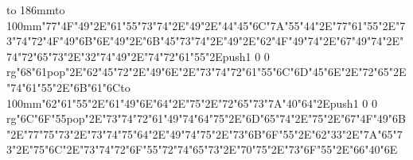 \hbox to 186mm{\hsize=81mm\vbox to 100mm{\vfill\ipa\char"77\ipa\char"4F\ipa\char"49\ipa\char"2E\ipa\char"61\ipa\char"55\ipa\char"73\ipa\char"74\ipa\char"2E\ipa\char"49\ipa\char"2E\ipa\char"44\ipa\char"45\ipa\char"6C\medskip\ipa\char"7A\ipa\char"55\ipa\char"44\ipa\char"2E\ipa\char"77\ipa\char"61\ipa\char"55\ipa\char"2E\ipa\char"73\ipa\char"74\ipa\char"72\ipa\char"4F\ipa\char"49\ipa\char"6B\medskip\ipa\char"6E\ipa\char"49\ipa\char"2E\ipa\char"6B\ipa\char"45\ipa\char"73\ipa\char"74\ipa\char"2E\ipa\char"49\ipa\char"2E\ipa\char"62\ipa\char"4F\ipa\char"49\ipa\char"74\ipa\char"2E\ipa\char"67\ipa\char"49\ipa\char"74\ipa\char"2E\ipa\char"74\ipa\char"72\ipa\char"65\ipa\char"73\ipa\char"2E\ipa\char"32\ipa\char"74\medskip\ipa\char"49\ipa\char"2E\ipa\char"74\ipa\char"72\ipa\char"61\ipa\char"55\ipa\char"2E\pdfcolorstack\match push{1 0 0 rg}\ipa\char"68\ipa\char"61\pdfcolorstack\match pop{}\ipa\char"2E\ipa\char"62\ipa\char"45\ipa\char"72\ipa\char"2E\ipa\char"49\ipa\char"6E\ipa\char"2E\ipa\char"73\ipa\char"74\ipa\char"72\ipa\char"61\ipa\char"55\ipa\char"6C\medskip\ipa\char"6D\ipa\char"45\ipa\char"6E\ipa\char"2E\ipa\char"72\ipa\char"65\ipa\char"2E\ipa\char"74\ipa\char"61\ipa\char"55\ipa\char"2E\ipa\char"6B\ipa\char"61\ipa\char"6C\vfill}\hfill\vbox to 100mm{\vfill\ipa\char"62\ipa\char"61\ipa\char"55\ipa\char"2E\ipa\char"61\ipa\char"49\ipa\char"6E\ipa\char"64\ipa\char"2E\ipa\char"75\ipa\char"2E\ipa\char"72\ipa\char"65\ipa\char"73\medskip\ipa\char"7A\ipa\char"40\ipa\char"64\ipa\char"2E\pdfcolorstack\match push{1 0 0 rg}\ipa\char"6C\ipa\char"6F\ipa\char"55\pdfcolorstack\match pop{}\ipa\char"2E\ipa\char"73\ipa\char"74\ipa\char"72\ipa\char"61\ipa\char"49\ipa\char"74\medskip\ipa\char"64\ipa\char"75\ipa\char"2E\ipa\char"6D\ipa\char"65\ipa\char"74\ipa\char"2E\ipa\char"75\ipa\char"2E\ipa\char"67\ipa\char"4F\ipa\char"49\ipa\char"6B\ipa\char"2E\ipa\char"77\ipa\char"75\ipa\char"73\ipa\char"2E\ipa\char"73\ipa\char"74\ipa\char"75\ipa\char"64\ipa\char"2E\ipa\char"49\ipa\char"74\medskip\ipa\char"75\ipa\char"2E\ipa\char"73\ipa\char"6B\ipa\char"6F\ipa\char"55\ipa\char"2E\ipa\char"62\ipa\char"33\ipa\char"2E\ipa\char"7A\ipa\char"65\ipa\char"73\ipa\char"2E\ipa\char"75\ipa\char"6C\ipa\char"2E\ipa\char"73\ipa\char"74\ipa\char"72\ipa\char"6F\ipa\char"55\ipa\char"72\medskip\ipa\char"74\ipa\char"65\ipa\char"73\ipa\char"2E\ipa\char"70\ipa\char"75\ipa\char"2E\ipa\char"73\ipa\char"6F\ipa\char"55\ipa\char"2E\ipa\char"66\ipa\char"40\ipa\char"6E\vfill}}\bye